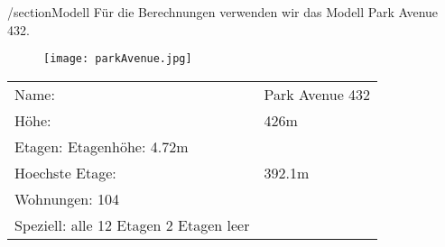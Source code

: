 /section{Modell}
Für die Berechnungen verwenden wir das Modell Park Avenue 432.
\begin{figure}[H]
\centering
\texttt{[image: parkAvenue.jpg]}

\end{figure}
\begin{table}[H]
\begin{tabular}{ll}
Name:				& Park Avenue 432\\
Höhe: 				& 426m\\          
Etagen:				%
Etagenhöhe:			4.72m\\
Hoechste Etage:		&392.1m\\
Wohnungen:			104\\
Speziell:			alle 12 Etagen 2 Etagen leer\\           
\end{tabular}
\end{table}
